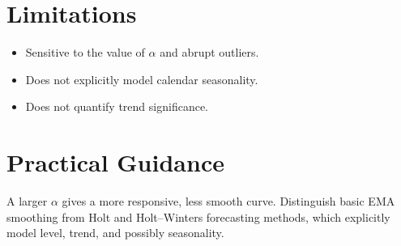 \documentclass[a4paper]{article}
\begin{document}
\section{Limitations}
\begin{itemize}
 \item Sensitive to the value of $\alpha$ and abrupt outliers.
 \item Does not explicitly model calendar seasonality.
 \item Does not quantify trend significance.
\end{itemize}
\section{Practical Guidance}
A larger $\alpha$ gives a more responsive, less smooth curve. Distinguish basic EMA smoothing from Holt and Holt--Winters forecasting methods, which explicitly model level, trend, and possibly seasonality.



\end{document}
